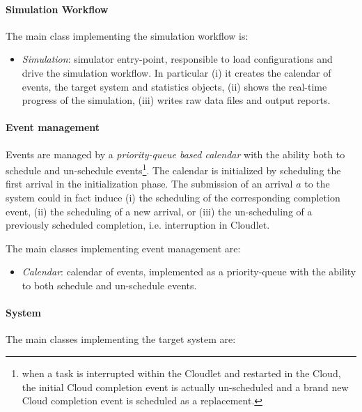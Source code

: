 \paragraph{Simulation Workflow}
The main class implementing the simulation workflow is:

\begin{itemize}
	
	\item \textit{Simulation}: simulator entry-point, responsible to load configurations and drive the simulation workflow. In particular
	(i) it creates the calendar of events, the target system and statistics objects, 
	(ii) shows the real-time progress of the simulation, 
	(iii) writes raw data files and output reports.

\end{itemize}

\paragraph{Event management}
Events are managed by a \textit{priority-queue based calendar} with the ability both to schedule and un-schedule events\footnote{when a task is interrupted within the Cloudlet and restarted in the Cloud, the initial Cloud completion event is actually un-scheduled and a brand new Cloud completion event is scheduled as a replacement.}.
%
The calendar is initialized by scheduling the first arrival in the initialization phase. The submission of an arrival $a$ to the system could in fact induce
(i) the scheduling of the corresponding completion event,
(ii) the scheduling of a new arrival, or
(iii) the un-scheduling of a previously scheduled completion, i.e. interruption in Cloudlet.

The main classes implementing event management are:

\begin{itemize}
	
	\item \textit{Calendar}: calendar of events, implemented as a priority-queue with the ability to both schedule and un-schedule events.
	
\end{itemize}

\paragraph{System}
The main classes implementing the target system are:

